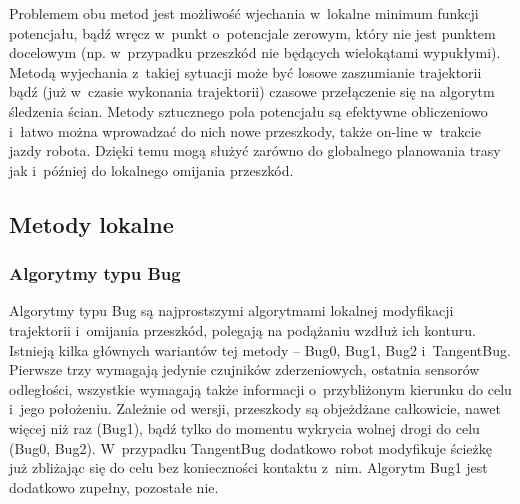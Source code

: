 Problemem obu metod jest możliwość
wjechania w~lokalne minimum funkcji potencjału, bądź wręcz w~punkt o~potencjale zerowym,
który nie jest punktem docelowym (np. w~przypadku przeszkód nie będących wielokątami
wypukłymi). Metodą wyjechania z~takiej sytuacji może być losowe zaszumianie trajektorii
bądź (już w~czasie wykonania trajektorii) czasowe przełączenie się na algorytm śledzenia
ścian. Metody sztucznego pola potencjału są efektywne obliczeniowo i~łatwo można wprowadzać
do nich nowe przeszkody, także on-line w~trakcie jazdy robota. Dzięki temu mogą służyć
zarówno do globalnego planowania trasy jak i~później do lokalnego omijania przeszkód.

\subsection{Metody lokalne}

\subsubsection{Algorytmy typu Bug}

Algorytmy typu Bug są najprostszymi algorytmami lokalnej modyfikacji
trajektorii i~omijania przeszkód, polegają na podążaniu wzdłuż ich konturu.
Istnieją kilka głównych wariantów tej metody -- Bug0, Bug1, Bug2 i~TangentBug.
Pierwsze trzy wymagają jedynie czujników zderzeniowych, ostatnia sensorów odległości,
wszystkie wymagają także informacji o~przybliżonym kierunku do celu i~jego położeniu.
Zależnie od wersji, przeszkody są objeżdżane całkowicie, nawet więcej niż raz (Bug1),
bądź tylko do momentu wykrycia wolnej drogi do celu (Bug0, Bug2). W~przypadku TangentBug
dodatkowo robot modyfikuje ścieżkę już zbliżając się do celu bez konieczności kontaktu
z~nim. Algorytm Bug1 jest dodatkowo zupełny, pozostałe nie.

